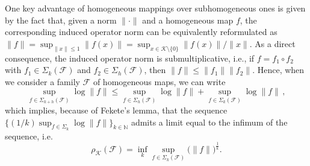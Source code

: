 \documentclass{article}
\newcommand{\N}{\mathbb{N}}
\newcommand{\family}{\mathcal{F}}
\newcommand{\cradius}{\rho_{\cone}}
\newcommand{\cone}{\mathcal{K}}
\begin{document}
%

%

One key advantage of homogeneous mappings over subhomogeneous ones is given by the fact that, given a norm $\|\cdot\|$ and a homogeneous map $f$, the corresponding induced operator norm can be equivalently reformulated as $\|f\|=\sup_{\|x\|\leq 1}\|f(x)\|=\sup_{x\in\cone\setminus\{0\}}\|f(x)\|/\|x\|$. As a direct consequence, the induced operator norm is submultiplicative, i.e., if $f=f_1\circ f_2$ with $f_1\in \Sigma_k(\family)$ and $f_2\in \Sigma_h(\family)$, then $\|f\|\leq \|f_1\|\|f_2\|$. Hence, when we consider a family $\family$ of homogeneous maps, we can write
%
\begin{equation}
    \sup_{f\in \Sigma_{k+h}(\family)}\log \|f\|\leq \sup_{f\in \Sigma_{h}(\family)}\log \|f\|+\sup_{f\in \Sigma_{k}(\family)}\log \|f\|\,,    
\end{equation}
%
which implies, because of Fekete's lemma, that the sequence $\{(1/k)\sup_{f\in \Sigma_{k}}\log \|f\|\}_{k\in \N}$ admits a limit equal to the infimum of the sequence, i.e.
%
\begin{equation}\label{Conespectralradius_characterization}
\cradius(\family)=\inf_k\sup_{f\in\Sigma_k(\family)}\big(\|f\|\big)^{\frac{1}{k}}. 
\end{equation}
%
%
\end{document}
